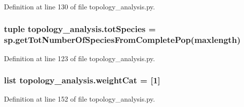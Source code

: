 Definition at line 130 of file topology\-\_\-analysis.\-py.

\hypertarget{a00128_ac657414359bc072005d43b2328119a7d}{
\subsubsection[{tot\-Species}]{\setlength{\rightskip}{0pt plus 5cm}tuple topology\-\_\-analysis.\-tot\-Species = sp.\-get\-Tot\-Number\-Of\-Species\-From\-Complete\-Pop(maxlength)}}\label{a00128_ac657414359bc072005d43b2328119a7d}


Definition at line 123 of file topology\-\_\-analysis.\-py.

\hypertarget{a00128_a67cf979bfd8cf26867524a1a788a5e63}{
\subsubsection[{weight\-Cat}]{\setlength{\rightskip}{0pt plus 5cm}list topology\-\_\-analysis.\-weight\-Cat = \mbox{[}1\mbox{]}}}\label{a00128_a67cf979bfd8cf26867524a1a788a5e63}


Definition at line 152 of file topology\-\_\-analysis.\-py.

